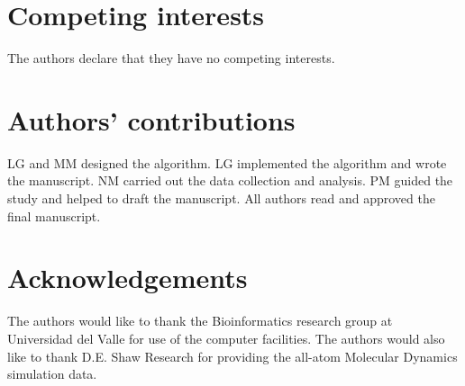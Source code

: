 \documentclass[twocolumn]{bmcart}%
\begin{document}
\begin{backmatter}

\section*{Competing interests}
The authors declare that they have no competing interests.

\section*{Authors’ contributions }
LG and MM designed the algorithm. LG implemented the algorithm and wrote the manuscript. NM carried out the data collection and analysis. PM guided the study and helped to draft the manuscript. All authors read and approved the final manuscript.

\section*{Acknowledgements}
The authors would like to thank the Bioinformatics research group at Universidad del Valle for use of the computer facilities. The authors would also like to thank D.E. Shaw Research for providing the all-atom Molecular Dynamics simulation data.




\end{backmatter}
\end{document}
